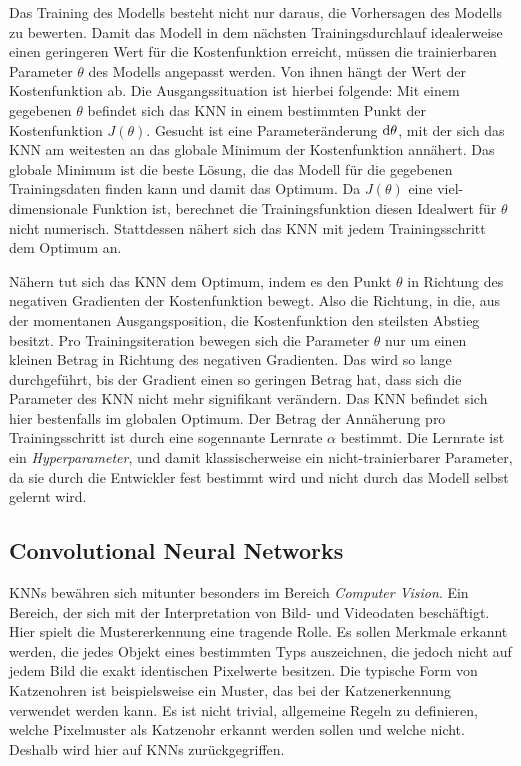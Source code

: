 Das Training des Modells besteht nicht nur daraus, die Vorhersagen des Modells zu bewerten. Damit das Modell in dem nächsten Trainingsdurchlauf idealerweise einen geringeren Wert für die Kostenfunktion erreicht, müssen die trainierbaren Parameter $\theta$ des Modells angepasst werden. Von ihnen hängt der Wert der Kostenfunktion ab. Die Ausgangssituation ist hierbei folgende: Mit einem gegebenen $\theta$ befindet sich das \ac{KNN} in einem bestimmten Punkt der Kostenfunktion $J(\theta)$. Gesucht ist eine Parameteränderung $\mathop{}\!\mathrm{d}\theta$, mit der sich das \ac{KNN} am weitesten an das globale Minimum der Kostenfunktion annähert. Das globale Minimum ist die beste Lösung, die das Modell für die gegebenen Trainingsdaten finden kann und damit das Optimum. Da $J(\theta)$ eine viel-dimensionale Funktion ist, berechnet die Trainingsfunktion diesen Idealwert für $\theta$ nicht numerisch. Stattdessen nähert sich das \ac{KNN} mit jedem Trainingsschritt dem Optimum an. \cite{knnsKompakt}

Nähern tut sich das \ac{KNN} dem Optimum, indem es den Punkt $\theta$ in Richtung des negativen Gradienten der Kostenfunktion bewegt. Also die Richtung, in die, aus der momentanen Ausgangsposition, die Kostenfunktion den steilsten Abstieg besitzt. Pro Trainingsiteration bewegen sich die Parameter $\theta$ nur um einen kleinen Betrag in Richtung des negativen Gradienten. Das wird so lange durchgeführt, bis der Gradient einen so geringen Betrag hat, dass sich die Parameter des \ac{KNN} nicht mehr signifikant verändern. Das \ac{KNN} befindet sich hier bestenfalls im globalen Optimum. Der Betrag der Annäherung pro Trainingsschritt ist durch eine sogennante Lernrate $\alpha$ bestimmt. Die Lernrate ist ein \emph{Hyperparameter}, und damit klassischerweise ein nicht-trainierbarer Parameter, da sie durch die Entwickler fest bestimmt wird und nicht durch das Modell selbst gelernt wird. \cite{knnsKompakt}


\subsection{Convolutional Neural Networks}
\acp{KNN} bewähren sich mitunter besonders im Bereich \emph{Computer Vision}. Ein Bereich, der sich mit der Interpretation von Bild- und Videodaten beschäftigt. Hier spielt die Mustererkennung eine tragende Rolle. Es sollen Merkmale erkannt werden, die jedes Objekt eines bestimmten Typs auszeichnen, die jedoch nicht auf jedem Bild die exakt identischen Pixelwerte besitzen. Die typische Form von Katzenohren ist beispielsweise ein Muster, das bei der Katzenerkennung verwendet werden kann. Es ist nicht trivial, allgemeine Regeln zu definieren, welche Pixelmuster als Katzenohr erkannt werden sollen und welche nicht. Deshalb wird hier auf \acp{KNN} zurückgegriffen.

